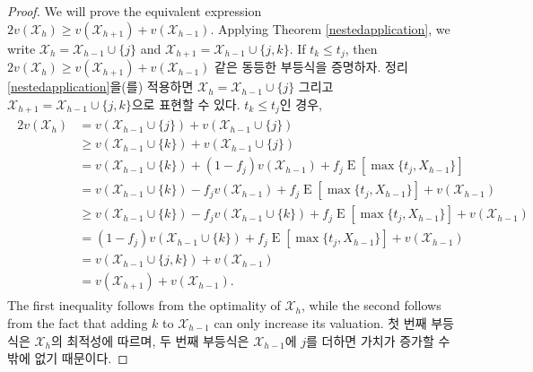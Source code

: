 \documentclass[11pt]{article} %
\theoremstyle{definition}
\theoremstyle{definition}
\begin{document}
\begin{proof}
\ifen We will prove the equivalent expression $2 v(\mathcal{X}_h) \geq v(\mathcal{X}_{h+1}) + v(\mathcal{X}_{h-1})$. Applying Theorem \ref{nestedapplication}, we write $\mathcal{X}_h = \mathcal{X}_{h-1} \cup\{j\}$ and $\mathcal{X}_{h+1} = \mathcal{X}_{h-1} \cup\{j, k\}$. If $t_k \leq t_j$, then 
\else $2 v(\mathcal{X}_h) \geq v(\mathcal{X}_{h+1}) + v(\mathcal{X}_{h-1})$ 같은 동등한 부등식을 증명하자. 정리 \ref{nestedapplication}을(를) 적용하면 $ \mathcal{X}_h = \mathcal{X}_{h-1} \cup\{j\}$ 그리고 $\mathcal{X}_{h+1} = \mathcal{X}_{h-1} \cup\{j, k\}$으로 표현할 수 있다. $t_k \leq t_j$인 경우, \fi
\begin{align}
\begin{split}
2 v(\mathcal{X}_h) &= v(\mathcal{X}_{h-1} \cup\{j\}) + v(\mathcal{X}_{h-1} \cup\{j\}) \\
&\geq v(\mathcal{X}_{h-1} \cup\{k\}) + v(\mathcal{X}_{h-1} \cup\{j\}) \\
&= v(\mathcal{X}_{h-1} \cup\{k\}) + (1 - f_j) v(\mathcal{X}_{h-1}) + f_j \operatorname{E}[\max\{t_j, X_{h-1}\}] \\
&= v(\mathcal{X}_{h-1} \cup\{k\}) - f_j v(\mathcal{X}_{h-1}) + f_j \operatorname{E}[\max\{t_j, X_{h-1}\}] + v(\mathcal{X}_{h-1})  \\
&\geq v(\mathcal{X}_{h-1} \cup\{k\})  - f_j v(\mathcal{X}_{h-1}\cup\{k\}) + f_j \operatorname{E}[\max\{t_j, X_{h-1}\}]+ v(\mathcal{X}_{h-1})\\
&= (1 - f_j) v(\mathcal{X}_{h-1} \cup\{k\})  + f_j \operatorname{E}[\max\{t_j, X_{h-1}\}]+ v(\mathcal{X}_{h-1})\\
&=  v(\mathcal{X}_{h-1} \cup\{j, k\}) + v(\mathcal{X}_{h-1})\\
&=  v(\mathcal{X}_{h+1}) + v(\mathcal{X}_{h-1}).
\end{split} 
\end{align}
\ifen The first inequality follows from the optimality of $\mathcal{X}_h$, while the second follows from the fact that adding $k$ to $\mathcal{X}_{h-1}$ can only increase its valuation.
\else 첫 번째 부등식은 $\mathcal{X}_h$의 최적성에 따르며, 두 번째 부등식은 $\mathcal{X}_{h-1}$에 $j$를 더하면 가치가 증가할 수밖에 없기 때문이다.\fi


\end{proof}
\end{document}
